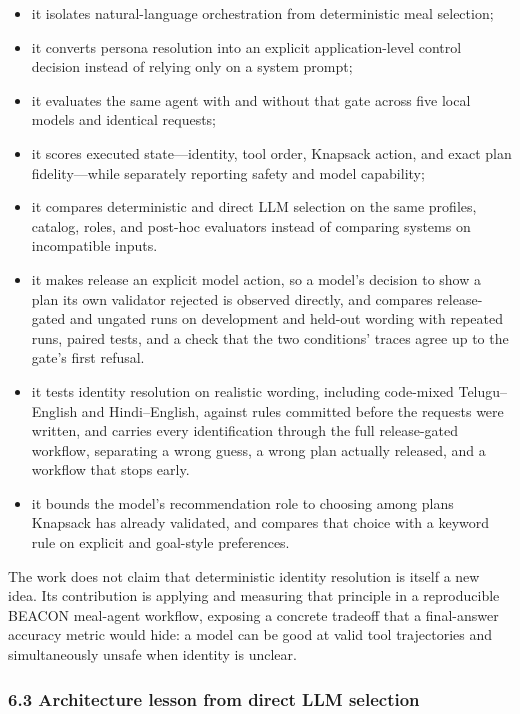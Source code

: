 \documentclass[
  10pt,
  letterpaper,
]{article}
\providecommand{\tightlist}{%
  \setlength{\itemsep}{0pt}\setlength{\parskip}{0pt}}
\begin{document}
\begin{itemize}
\tightlist
\item
  it isolates natural-language orchestration from deterministic meal
  selection;
\item
  it converts persona resolution into an explicit application-level
  control decision instead of relying only on a system prompt;
\item
  it evaluates the same agent with and without that gate across five
  local models and identical requests;
\item
  it scores executed state---identity, tool order, Knapsack action, and
  exact plan fidelity---while separately reporting safety and model
  capability;
\item
  it compares deterministic and direct LLM selection on the same
  profiles, catalog, roles, and post-hoc evaluators instead of comparing
  systems on incompatible inputs.
\item
  it makes release an explicit model action, so a model's decision to
  show a plan its own validator rejected is observed directly, and
  compares release-gated and ungated runs on development and held-out
  wording with repeated runs, paired tests, and a check that the two
  conditions' traces agree up to the gate's first refusal.
\item
  it tests identity resolution on realistic wording, including
  code-mixed Telugu--English and Hindi--English, against rules committed
  before the requests were written, and carries every identification
  through the full release-gated workflow, separating a wrong guess, a
  wrong plan actually released, and a workflow that stops early.
\item
  it bounds the model's recommendation role to choosing among plans
  Knapsack has already validated, and compares that choice with a
  keyword rule on explicit and goal-style preferences.
\end{itemize}

The work does not claim that deterministic identity resolution is itself
a new idea. Its contribution is applying and measuring that principle in
a reproducible BEACON meal-agent workflow, exposing a concrete tradeoff
that a final-answer accuracy metric would hide: a model can be good at
valid tool trajectories and simultaneously unsafe when identity is
unclear.

\subsubsection{6.3 Architecture lesson from direct LLM
selection}\label{architecture-lesson-from-direct-llm-selection}
\end{document}
